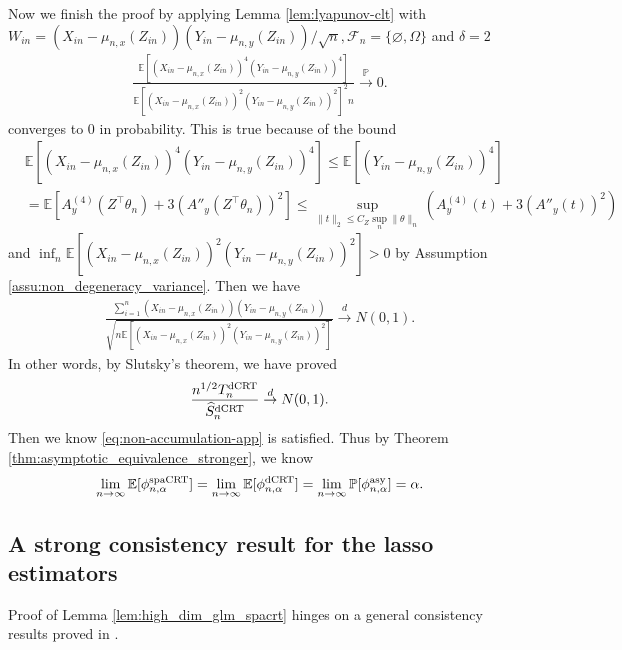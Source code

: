 \documentclass[12pt]{article}
\theoremstyle{definition}
\def\P{\mathbb{P}}
\def\P{\mathbb{P}}
\newcommand{\E}{\mathbb E}								%
\renewcommand{\P}{\mathbb{P}}							%
\newcommand{\convp}{\overset{\mathbb{P}}{\rightarrow}}             %
\newcommand{\convd}{\overset d \rightarrow}             %
\newcommand{\srx}{X}									%
\newcommand{\srz}{Z}									%
\newcommand{\sry}{Y}									%
\newcommand{\dCRT}{\textnormal{dCRT}} 					%
\newcommand{\spacrt}{\textnormal{spaCRT}}               %
\newcommand{\asy}{\textnormal{asy}}              %
\begin{document}
Now we finish the proof by applying Lemma \ref{lem:lyapunov-clt} with $W_{in}=(\srx_{in}-\mu_{n,x}(\srz_{in}))(\sry_{in}-\mu_{n,y}(\srz_{in}))/\sqrt{n},\mathcal{F}_n=\{\varnothing,\Omega\}$ and $\delta=2$
\begin{align*}
  \frac{\E[(\srx_{in}-\mu_{n,x}(\srz_{in}))^4(\sry_{in}-\mu_{n,y}(\srz_{in}))^4]}{\E[(\srx_{in}-\mu_{n,x}(\srz_{in}))^2(\sry_{in}-\mu_{n,y}(\srz_{in}))^2]^{2}n} \convp 0.
\end{align*}
converges to $0$ in probability. This is true because of the bound 
\begin{align*}
  &
  \E[(\srx_{in}-\mu_{n,x}(\srz_{in}))^4(\sry_{in}-\mu_{n,y}(\srz_{in}))^4]\leq \E[(\sry_{in}-\mu_{n,y}(\srz_{in}))^4]\\
  &
  =\E[A^{(4)}_y(\srz^\top \theta_n)+3(A''_y(\srz^\top \theta_n))^2]\leq \sup_{\|t\|_2\leq C_Z\sup_n\|\theta\|_n}(A_y^{(4)}(t)+3(A''_y(t))^2)
\end{align*}
and $\inf_n\E[(\srx_{in}-\mu_{n,x}(\srz_{in}))^2(\sry_{in}-\mu_{n,y}(\srz_{in}))^2]>0$ by Assumption \ref{assu:non_degeneracy_variance}. Then we have 
\begin{align*}
  \frac{\sum_{i=1}^n(\srx_{in}-\mu_{n,x}(\srz_{in}))(\sry_{in}-\mu_{n,y}(\srz_{in}))}{\sqrt{n\E[(\srx_{in}-\mu_{n,x}(\srz_{in}))^2(\sry_{in}-\mu_{n,y}(\srz_{in}))^2]}}\convd N(0,1).
\end{align*}
In other words, by Slutsky's theorem, we have proved
\begin{align*}
  \frac{n^{1/2}T_n^{\dCRT}}{\widehat{S}_n^{\dCRT}}\convd N(0,1).
\end{align*}
Then we know \eqref{eq:non-accumulation-app} is satisfied. Thus by Theorem \ref{thm:asymptotic_equivalence_stronger}, we know 
\begin{align*}
  \lim_{n\rightarrow\infty}\E[\phi_{n,\alpha}^{\spacrt}]=\lim_{n\rightarrow\infty}\E[\phi_{n,\alpha}^{\dCRT}]=\lim_{n\rightarrow\infty}\P[\phi_{n,\alpha}^{\asy}]=\alpha.
\end{align*}


\subsection{A strong consistency result for the lasso estimators}

Proof of Lemma \ref{lem:high_dim_glm_spacrt} hinges on a general consistency results proved in \citep{wainwright2019high}.
  
\end{document}
